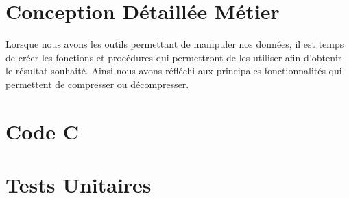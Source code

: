 \documentclass{article}
\begin{document}
\section{Conception Détaillée Métier}

    Lorsque nous avons les outils permettant de manipuler nos données, il est temps de créer les fonctions et procédures qui permettront de les utiliser afin d'obtenir le résultat souhaité. Ainsi nous avons réfléchi aux principales fonctionnalités qui permettent de compresser ou décompresser.

    

\clearpage %

\section{Code C}
    
    \clearpage
    
    \clearpage
    
    \clearpage
    
    \clearpage
    
    \clearpage
    
    \clearpage
    
    \clearpage
    
    \clearpage
    
    \clearpage
    
    \clearpage
    
    \clearpage
    
    \clearpage
    
    \clearpage
    
    \clearpage
    

\clearpage %

\section{Tests Unitaires}
    

\clearpage %
\end{document}
